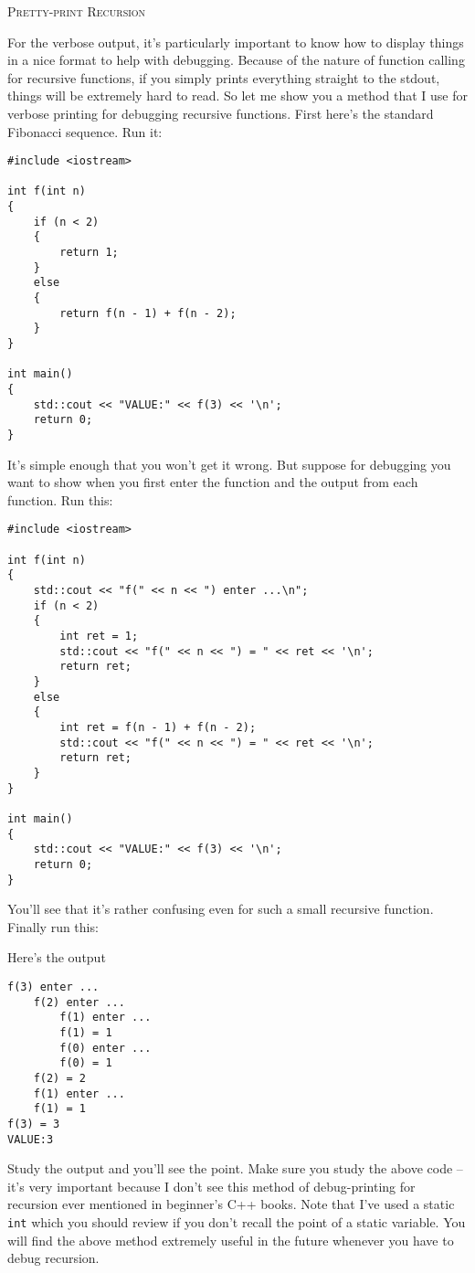 \textsc{Pretty-print Recursion}

For the verbose output, it's particularly important to know how to display
things in a nice format to help with debugging.
Because of the nature of function calling for recursive functions,
if you simply prints everything straight to the stdout, things will be extremely
hard to read.
So let me show you a method that I use for verbose printing for debugging
recursive functions.
First here's the standard Fibonacci sequence. Run it:
\begin{Verbatim}[frame=single,fontsize=\footnotesize]
#include <iostream>

int f(int n)
{
    if (n < 2)
    {
        return 1;
    }
    else
    {
        return f(n - 1) + f(n - 2);
    }
}

int main()
{
    std::cout << "VALUE:" << f(3) << '\n';
    return 0;
}
\end{Verbatim}
It's simple enough that you won't get it wrong.
But suppose for debugging you want to show when you first enter the function and the output from each function.
Run this: 
\begin{Verbatim}[frame=single,fontsize=\footnotesize]
#include <iostream>

int f(int n)
{
    std::cout << "f(" << n << ") enter ...\n";
    if (n < 2)
    {
        int ret = 1;
        std::cout << "f(" << n << ") = " << ret << '\n';
        return ret;
    }
    else
    {
        int ret = f(n - 1) + f(n - 2);
        std::cout << "f(" << n << ") = " << ret << '\n';
        return ret;
    }
}

int main()
{
    std::cout << "VALUE:" << f(3) << '\n';
    return 0;
}
\end{Verbatim}
You'll see that it's rather confusing even for such a small recursive function.
Finally run this:
{\footnotesize
{}
}

Here's the output
\begin{Verbatim}[frame=single,fontsize=\footnotesize]
f(3) enter ...
    f(2) enter ...
        f(1) enter ...
        f(1) = 1
        f(0) enter ...
        f(0) = 1
    f(2) = 2
    f(1) enter ...
    f(1) = 1
f(3) = 3
VALUE:3
\end{Verbatim}

Study the output and you'll see the point.
Make sure you study the above code -- it's very important because
I don't see this method of debug-printing for recursion ever mentioned in
beginner's C++ books.
Note that I've used a static \verb!int! which you should review 
if you don't recall the point of a static variable.
You will find the above method extremely useful in the future whenever you
have to debug recursion.
